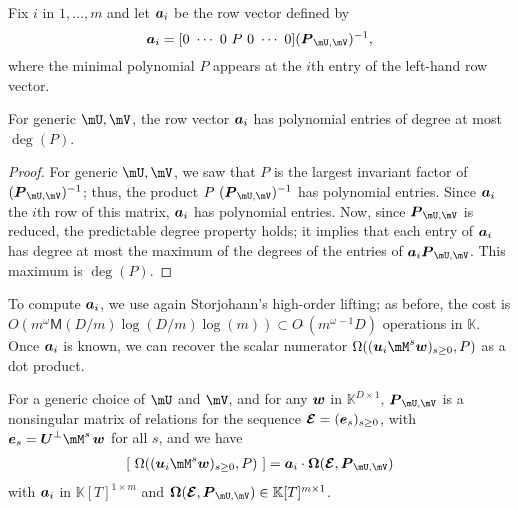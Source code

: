 \documentclass[12pt]{article}
\newcommand{\var}{T} %
\newcommand{\mat}[1]{\bm{\MakeUppercase{#1}}} %
\newcommand{\row}[1]{\bm{\MakeLowercase{#1}}} %
\newcommand{\col}[1]{\bm{\MakeLowercase{#1}}} %
\newcommand{\softO}[1]{O{\tilde{~}}(#1)} %
\newcommand{\minpoly}{P}
\def\M {\ensuremath{\mathsf{M}}}
\def\K{\mathbb{K}}
\def\K {\ensuremath{\mathbb{K}}}
\begin{document}
Fix $i$ in $1,\dots,m$ and let $\row{a}_i$ be the row vector defined
by $$\row{a}_i =[0~\cdots~0~\minpoly~0~\cdots~0]  (\mat{P}_{\mU,\mV})^{-1} ,$$
where the minimal polynomial $\minpoly$ appears at the $i$th entry  of the
left-hand row vector. 
\begin{lemma}\label{utilde}
  For generic $\mU,\mV$, the row vector $\row{a}_i$ has polynomial
  entries of degree at most~$\deg(P)$.
\end{lemma}
\begin{proof}
  For generic $\mU,\mV$, we saw that $\minpoly$ is the largest invariant factor
  of $ (\mat{P}_{\mU,\mV})^{-1}$; thus, the product $\minpoly\
  (\mat{P}_{\mU,\mV})^{-1}$ has polynomial entries. Since $\row{a}_i$ the $i$th
  row of this matrix, $\row{a}_i$ has polynomial entries.  Now, since
  $\mat{P}_{\mU,\mV}$ is reduced, the predictable degree property
  \cite[Theorem~6.3-13]{Kailath80} holds; it implies that each entry of
  $\row{a}_i$ has degree at most the maximum of the degrees of the entries of
  $\row{a}_i\mat{P}_{\mU,\mV}$. This maximum is $\deg(\minpoly)$.
\end{proof}
To compute $\row{a}_i$, we use again Storjohann's high-order lifting;
as before, the cost is $O(m^{\omega} \M(D/m) \log(D/m) \log(m))
\subset \softO{m^{\omega-1}D}$ operations in $\K$.
Once $\row{a}_i$ is known, we can recover the scalar numerator
$\Omega((\row{u}_i \mM^s \col{w})_{s \ge 0}, \minpoly)$ as
a dot product. 
\begin{lemma}\label{lemma:omegaOmega}
  For a generic choice of $\mU$ and $\mV$, and for any $\col{w}$ in
  $\K^{D \times 1}$, $ \mat{P}_{\mU,\mV}$ is a nonsingular matrix of
  relations for the sequence $\mat{\mathcal{E}} =
  (\col{e}_s)_{s\ge0}$, with $\col{e}_s=\mat{U}^\perp \mM^s\, \col{w}$
  for all $s$, and we have
\begin{align}\label{eq:OmegaOmega}
[~\Omega((\row{u}_i \mM^s \col{w})_{s \ge 0}, \minpoly)~] = \row{a}_i\cdot \mat{\Omega}(\mat{\mathcal{E}}, \mat{P}_{\mU,\mV})
\end{align}
with $\row{a}_i$ in $\K[\var]^{1 \times m}$ and 
$\mat{\Omega}(\mat{\mathcal{E}} , \mat{P}_{\mU,\mV}) \in \K[\var]^{m \times 1}$.
\end{lemma}
\end{document}

